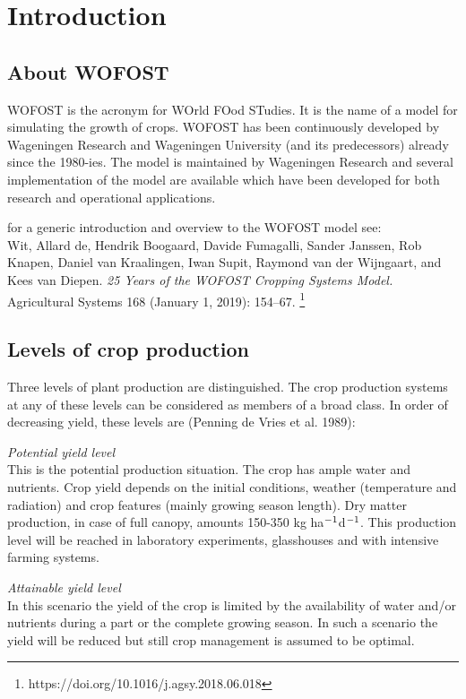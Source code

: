 
\chapter{Introduction} 

\section{About WOFOST}

WOFOST is the acronym for WOrld FOod STudies. It is the name of a model for
simulating the growth of crops. WOFOST has been continuously developed by
Wageningen Research and Wageningen University (and its predecessors) already
since the 1980-ies. The model is maintained by Wageningen 
Research and several implementation of the model are available which have been
developed for both research and operational applications.

for a generic introduction and overview to the WOFOST model see:\\
Wit, Allard de, Hendrik Boogaard, Davide Fumagalli, Sander Janssen, Rob Knapen, 
Daniel van Kraalingen, Iwan Supit, Raymond van der Wijngaart, and Kees van Diepen. 
\textit{25 Years of the WOFOST Cropping Systems Model.} Agricultural Systems 168 
(January 1, 2019): 154–67. \footnote{https://doi.org/10.1016/j.agsy.2018.06.018}


\section{Levels of crop production}
Three levels of plant
production are distinguished. The crop production systems at any of these levels can
be considered as members of a broad class. In order of decreasing yield, these levels
are (Penning de Vries et al. 1989):

{\it Potential yield level\/}\\
This is the potential production situation. The crop has ample water and nutrients.
Crop yield depends on the initial conditions, weather (temperature and radiation)
and crop features (mainly growing season length).
Dry matter production, in case of full canopy, amounts 150-350 kg ha$^{{\rm -1}}$d$^{{\rm -1}}$. This
production level will be reached in laboratory experiments, glasshouses and with
intensive farming systems.

{\it Attainable yield level\/}\\
In this scenario the yield of the crop is limited by the availability of water and/or nutrients 
during a part or the complete
growing season. In such a scenario the yield will be reduced but still crop management is assumed to be 
optimal.

